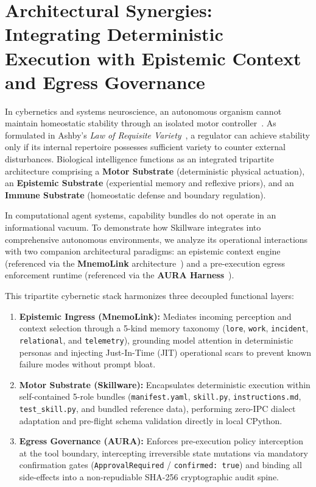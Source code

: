 
\section{Architectural Synergies: Integrating Deterministic Execution with Epistemic Context and Egress Governance}
\label{sec:tripartite_ecosystem}

In cybernetics and systems neuroscience, an autonomous organism cannot maintain homeostatic stability through an isolated motor controller~\cite{ashby1956introduction, arbib1981perceptual}. As formulated in Ashby's \emph{Law of Requisite Variety}~\cite{ashby1956introduction}, a regulator can achieve stability only if its internal repertoire possesses sufficient variety to counter external disturbances. Biological intelligence functions as an integrated tripartite architecture comprising a \textbf{Motor Substrate} (deterministic physical actuation), an \textbf{Epistemic Substrate} (experiential memory and reflexive priors), and an \textbf{Immune Substrate} (homeostatic defense and boundary regulation).

In computational agent systems, capability bundles do not operate in an informational vacuum. To demonstrate how Skillware integrates into comprehensive autonomous environments, we analyze its operational interactions with two companion architectural paradigms: an epistemic context engine (referenced via the \textbf{MnemoLink} architecture~\cite{mnemolink2026matrix}) and a pre-execution egress enforcement runtime (referenced via the \textbf{AURA Harness}~\cite{aura2026harness}).

This tripartite cybernetic stack harmonizes three decoupled functional layers:
\begin{enumerate}[leftmargin=*]
  \item \textbf{Epistemic Ingress (MnemoLink):} Mediates incoming perception and context selection through a 5-kind memory taxonomy (\texttt{lore}, \texttt{work}, \texttt{incident}, \texttt{relational}, and \texttt{telemetry}), grounding model attention in deterministic personas and injecting Just-In-Time (JIT) operational scars to prevent known failure modes without prompt bloat.
  \item \textbf{Motor Substrate (Skillware):} Encapsulates deterministic execution within self-contained 5-role bundles (\texttt{manifest.yaml}, \texttt{skill.py}, \texttt{instructions.md}, \texttt{test\_skill.py}, and bundled reference data), performing zero-IPC dialect adaptation and pre-flight schema validation directly in local CPython.
  \item \textbf{Egress Governance (AURA):} Enforces pre-execution policy interception at the tool boundary, intercepting irreversible state mutations via mandatory confirmation gates (\texttt{ApprovalRequired} / \texttt{confirmed: true}) and binding all side-effects into a non-repudiable SHA-256 cryptographic audit spine.
\end{enumerate}

